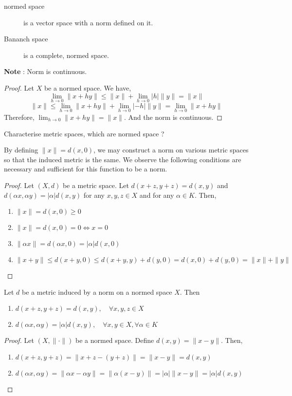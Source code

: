 \begin{description}
	\item[normed space] is a vector space with a norm defined on it.
	\item[Bananch space] is a complete, normed space.
\end{description}

\textbf{Note} : Norm is continuous.
\begin{proof}
	Let $X$ be a normed space.
	We have,
	$$ \lim_{h \to 0} \| x+hy \| \le \| x \| + \lim_{h \to 0} |h| \| y \| = \| x \|$$
	$$ \| x \| \le \lim_{h \to 0} \|x+hy\| + \lim_{h \to 0}|-h| \|y\| = \lim_{h \to 0} \| x+hy \|$$
	Therefore, $\displaystyle \lim_{h \to 0} \|x +hy \| = \| x \|$.
	And the norm is continuous.
\end{proof}

\begin{challenge}
	Characterise metric spaces, which are normed space ?\\
\end{challenge}
\begin{commentary}
	By defining $\|x\| = d(x,0)$, we may construct a norm on various metric spaces so that the induced metric is the same.
	We observe the following conditions are necessary and sufficient for this function to be a norm.
\begin{proof}
	Let $(X,d)$ be a metric space.
	Let $d(x+z,y+z) = d(x,y)$ and $d(\alpha x,\alpha y) = |\alpha|d(x,y)$ for any $x,y,z \in X$ and for any $\alpha \in K$.
	Then,
	\begin{enumerate}
		\item $ \| x \| = d(x,0) \ge 0 $
		\item $ \| x \| = d(x,0) = 0 \iff x = 0 $
		\item $ \| \alpha x \| = d(\alpha x,0) = |\alpha|d(x,0) $
		\item $ \| x+y \| \le d(x+y,0) \le d(x+y,y)+d(y,0) = d(x,0) + d(y,0) = \|x\| + \|y\| $
	\end{enumerate}
\end{proof}
\end{commentary}
\begin{lemma}
	Let $d$ be a metric induced by a norm on a normed space $X$.
	Then
	\begin{enumerate}
		\item $d(x+z,y+z) = d(x,y), \quad \forall x,y,z \in X$
		\item $d(\alpha x,\alpha y) = |\alpha| d(x,y),\quad \forall x,y \in X, \forall \alpha \in K$
	\end{enumerate}
\end{lemma}
\begin{proof}
	Let $(X,\| \cdot \|)$ be a normed space.
	Define $d(x,y) = \| x-y \|$.
	Then,
	\begin{enumerate}
		\item $ d(x+z,y+z) = \| x+z-(y+z) \| = \| x-y \| = d(x,y)$
		\item $ d(\alpha x, \alpha y) = \| \alpha x - \alpha y \| = \| \alpha (x-y) \| = |\alpha| \| x-y \| = |\alpha|d(x,y)$
	\end{enumerate}
\end{proof}

